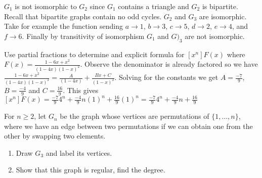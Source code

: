 \begin{enumerate}
\begin{center}
\end{center}
    
    $G_1$ is not isomorphic to $G_2$ since $G_1$ contains a triangle and $G_2$ is bipartite. Recall that bipartite graphs contain no odd cycles. $G_2$ and $G_3$ are isomorphic. Take for example the function sending $a\rightarrow 1$, $b\rightarrow 3$, $c\rightarrow 5$, $d\rightarrow 2$, $e\rightarrow 4$, and $f\rightarrow 6$. Finally by transitivity of isomorphism $G_1$ and $G)_3$ are not isomorphic. 
    
     Use partial fractions to determine and explicit formula for $[x^n]F(x)$ where $F(x)=\frac{1-6x+x^2}{(1-4x)(1-x)^2}$.
    \answer Observe the denominator is already factored so we have $\frac{1-6x+x^2}{(1-4x)(1-x)^2}=\frac{A}{(1-4x)}+\frac{Bx+C}{(1-x)^2}$. Solving for the constants we get $A=\frac{-7}{9}$, $B=\frac{-4}{9}$ and $C=\frac{16}{9}$. This gives $[x^n]F(x)=\frac{-7}{9}4^n+\frac{-4}{9}n(1)^{n}+\frac{16}{9}(1)^n=\frac{-7}{9}4^n+\frac{-4}{9}n+\frac{16}{9}$
    
    \newpage

     For $n \ge 2$, let $G_n$ be the graph whose vertices are permutations of $\{1, \dots, n\}$, where we have an edge between two permutations if we can obtain one from the other by swapping two elements. 
    \begin{enumerate}
        \item Draw $G_3$ and label its vertices. 
        \item Show that this graph is regular, find the degree.
        

\end{enumerate}
\end{enumerate}

